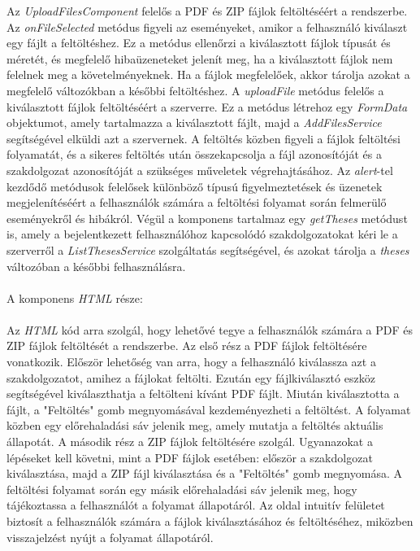 Az \textit{UploadFilesComponent} felelős a PDF és ZIP fájlok feltöltéséért a rendszerbe. Az \textit{onFileSelected} metódus figyeli az eseményeket, amikor a felhasználó kiválaszt egy fájlt a feltöltéshez. Ez a metódus ellenőrzi a kiválasztott fájlok típusát és méretét, és megfelelő hibaüzeneteket jelenít meg, ha a kiválasztott fájlok nem felelnek meg a követelményeknek. Ha a fájlok megfelelőek, akkor tárolja azokat a megfelelő változókban a későbbi feltöltéshez. A \textit{uploadFile} metódus felelős a kiválasztott fájlok feltöltéséért a szerverre. Ez a metódus létrehoz egy \textit{FormData} objektumot, amely tartalmazza a kiválasztott fájlt, majd a \textit{AddFilesService} segítségével elküldi azt a szervernek. A feltöltés közben figyeli a fájlok feltöltési folyamatát, és a sikeres feltöltés után összekapcsolja a fájl azonosítóját és a szakdolgozat azonosítóját a szükséges műveletek végrehajtásához. Az \textit{alert}-tel kezdődő metódusok felelősek különböző típusú figyelmeztetések és üzenetek megjelenítéséért a felhasználók számára a feltöltési folyamat során felmerülő eseményekről és hibákról. Végül a komponens tartalmaz egy \textit{getTheses} metódust is, amely a bejelentkezett felhasználóhoz kapcsolódó szakdolgozatokat kéri le a szerverről a \textit{ListThesesService} szolgáltatás segítségével, és azokat tárolja a \textit{theses} változóban a későbbi felhasználásra.\\
\\
A komponens \textit{HTML} része:\\
\\
Az \textit{HTML} kód arra szolgál, hogy lehetővé tegye a felhasználók számára a PDF és ZIP fájlok feltöltését a rendszerbe. Az első rész a PDF fájlok feltöltésére vonatkozik. Először lehetőség van arra, hogy a felhasználó kiválassza azt a szakdolgozatot, amihez a fájlokat feltölti. Ezután egy fájlkiválasztó eszköz segítségével kiválaszthatja a feltölteni kívánt PDF fájlt. Miután kiválasztotta a fájlt, a "Feltöltés" gomb megnyomásával kezdeményezheti a feltöltést. A folyamat közben egy előrehaladási sáv jelenik meg, amely mutatja a feltöltés aktuális állapotát. A második rész a ZIP fájlok feltöltésére szolgál. Ugyanazokat a lépéseket kell követni, mint a PDF fájlok esetében: először a szakdolgozat kiválasztása, majd a ZIP fájl kiválasztása és a "Feltöltés" gomb megnyomása. A feltöltési folyamat során egy másik előrehaladási sáv jelenik meg, hogy tájékoztassa a felhasználót a folyamat állapotáról. Az oldal intuitív felületet biztosít a felhasználók számára a fájlok kiválasztásához és feltöltéséhez, miközben visszajelzést nyújt a folyamat állapotáról.

